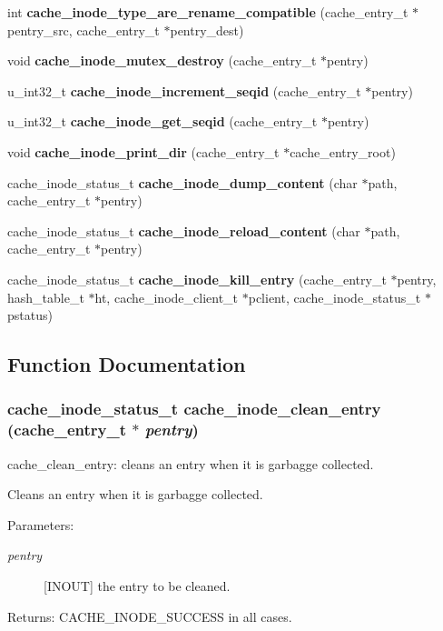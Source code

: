 \begin{CompactItemize}
int {\bf cache\_\-inode\_\-type\_\-are\_\-rename\_\-compatible} (cache\_\-entry\_\-t $\ast$pentry\_\-src, cache\_\-entry\_\-t $\ast$pentry\_\-dest)
\item 
void {\bf cache\_\-inode\_\-mutex\_\-destroy} (cache\_\-entry\_\-t $\ast$pentry)
\item 
u\_\-int32\_\-t {\bf cache\_\-inode\_\-increment\_\-seqid} (cache\_\-entry\_\-t $\ast$pentry)
\item 
u\_\-int32\_\-t {\bf cache\_\-inode\_\-get\_\-seqid} (cache\_\-entry\_\-t $\ast$pentry)
\item 
void {\bf cache\_\-inode\_\-print\_\-dir} (cache\_\-entry\_\-t $\ast$cache\_\-entry\_\-root)
\item 
cache\_\-inode\_\-status\_\-t {\bf cache\_\-inode\_\-dump\_\-content} (char $\ast$path, cache\_\-entry\_\-t $\ast$pentry)
\item 
cache\_\-inode\_\-status\_\-t {\bf cache\_\-inode\_\-reload\_\-content} (char $\ast$path, cache\_\-entry\_\-t $\ast$pentry)
\item 
cache\_\-inode\_\-status\_\-t {\bf cache\_\-inode\_\-kill\_\-entry} (cache\_\-entry\_\-t $\ast$pentry, hash\_\-table\_\-t $\ast$ht, cache\_\-inode\_\-client\_\-t $\ast$pclient, cache\_\-inode\_\-status\_\-t $\ast$pstatus)
\end{CompactItemize}


\subsection{Function Documentation}
\subsubsection{\setlength{\rightskip}{0pt plus 5cm}cache\_\-inode\_\-status\_\-t cache\_\-inode\_\-clean\_\-entry (cache\_\-entry\_\-t $\ast$ {\em pentry})}\label{cache__inode__misc_8c_a4}


cache\_\-clean\_\-entry: cleans an entry when it is garbagge collected.

Cleans an entry when it is garbagge collected.

\begin{Desc}
\item[Parameters:]
\begin{description}
\item[{\em pentry}][INOUT] the entry to be cleaned.\end{description}
\end{Desc}
\begin{Desc}
\item[Returns:]CACHE\_\-INODE\_\-SUCCESS in all cases. \end{Desc}


